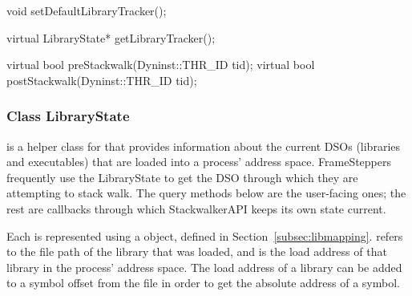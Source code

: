 \begin{apient}
void setDefaultLibraryTracker();
\end{apient}

\begin{apient}
virtual LibraryState* getLibraryTracker();
\end{apient}

\begin{apient}
virtual bool preStackwalk(Dyninst::THR_ID tid);
virtual bool postStackwalk(Dyninst::THR_ID tid);
\end{apient}

\subsubsection{Class LibraryState}
\label{subsubsec:librarystate}


 is a helper class for  that provides information about
the current DSOs (libraries and executables) that are loaded into a process'
address space. FrameSteppers frequently use the LibraryState to get the DSO
through which they are attempting to stack walk.  The query methods below are
the user-facing ones; the rest are callbacks through which StackwalkerAPI keeps
its own state current.

Each  is represented using a  object, defined in
Section~\ref{subsec:libmapping}.   refers to the file path
of the library that was loaded, and  is the load address
of that library in the process' address space.  The load address of a library can
be added to a symbol offset from the file in order to get the absolute address of
a symbol.

